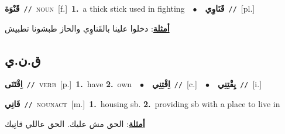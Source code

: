 \documentclass[10pt,a4paper,twoside]{article} %
\begin{document}
\begin{multicols}{2}
{\setlength\topsep{0pt}\textbf{\foreignlanguage{arabic}{قَنْوَة}}\ {\color{gray}\texttt{//}\color{black}}\ \textsc{noun}\ [f.]\ \textbf{1.}~a thick stick used in fighting\ \ $\bullet$\ \ \setlength\topsep{0pt}\textbf{\foreignlanguage{arabic}{قَنَاوِي}}\ {\color{gray}\texttt{//}\color{black}}\ [pl.]\  \begin{flushright}\color{gray}\foreignlanguage{arabic}{\textbf{\underline{\foreignlanguage{arabic}{أمثلة}}}: دخلوا علينا بالقَناوِي والحاز طبشونا تطبيش}\end{flushright}\color{black}} \vspace{2mm}

\vspace{-3mm}
\subsection*{\color{blue}\foreignlanguage{arabic}{ق.ن.ي}\color{blue}{}} 

{\setlength\topsep{0pt}\textbf{\foreignlanguage{arabic}{اِقْتَنَى}}\ {\color{gray}\texttt{//}\color{black}}\ \textsc{verb}\ [p.]\ \textbf{1.}~have  \textbf{2.}~own\ \ $\bullet$\ \ \setlength\topsep{0pt}\textbf{\foreignlanguage{arabic}{اِقْتِنِي}}\ {\color{gray}\texttt{//}\color{black}}\ [c.]\ \ $\bullet$\ \ \setlength\topsep{0pt}\textbf{\foreignlanguage{arabic}{يِقْتِنِي}}\ {\color{gray}\texttt{//}\color{black}}\ [i.]\ } \vspace{2mm}

{\setlength\topsep{0pt}\textbf{\foreignlanguage{arabic}{قَانِي}}\ {\color{gray}\texttt{//}\color{black}}\ \textsc{noun\textunderscore act}\ [m.]\ \textbf{1.}~housing sb.  \textbf{2.}~providing sb with a place to live in\  \begin{flushright}\color{gray}\foreignlanguage{arabic}{\textbf{\underline{\foreignlanguage{arabic}{أمثلة}}}: الحق مش عليك. الحق عاللي قانِيك}\end{flushright}\color{black}} \vspace{2mm}


\end{multicols}
\end{document}
